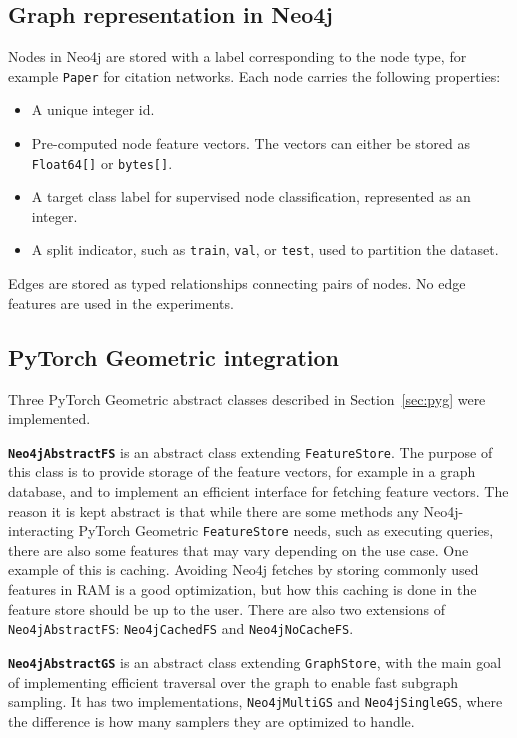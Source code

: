 \documentclass[PhD]{uclathes}
\begin{document}
\subsection{Graph representation in Neo4j}\label{sec:graph_repr}
Nodes in Neo4j are stored with a label corresponding to the node type, for
example \texttt{Paper} for citation networks. Each node carries the following
properties:

\begin{itemize}
    \item A unique integer id.
    \item Pre-computed node feature vectors. The vectors can either be stored as \texttt{Float64[]} or \texttt{bytes[]}.
    \item A target class label for supervised node classification, represented as an integer.
    \item A split indicator, such as \texttt{train}, \texttt{val}, or \texttt{test}, used to partition the dataset.
\end{itemize}

Edges are stored as typed relationships connecting pairs of nodes. No edge
features are used in the experiments.

\subsection{PyTorch Geometric integration}\label{sec:pyg_impl}
Three PyTorch Geometric abstract classes described in Section~\ref{sec:pyg}
were implemented.

\noindent \textbf{\texttt{Neo4jAbstractFS}} is an abstract class extending
\texttt{FeatureStore}. The purpose of this class is to provide storage of the
feature vectors, for example in a graph database, and to implement an
efficient interface for fetching feature vectors. The reason it is kept
abstract is that while there are some methods any Neo4j-interacting PyTorch
Geometric \texttt{FeatureStore} needs, such as executing queries, there are
also some features that may vary depending on the use case. One example of
this is caching. Avoiding Neo4j fetches by storing commonly used features in
RAM is a good optimization, but how this caching is done in the feature store
should be up to the user. There are also two extensions of
\texttt{Neo4jAbstractFS}: \texttt{Neo4jCachedFS} and \texttt{Neo4jNoCacheFS}.

\noindent \textbf{\texttt{Neo4jAbstractGS}} is an abstract class extending
\texttt{GraphStore}, with the main goal of implementing efficient traversal
over the graph to enable fast subgraph sampling. It has two implementations,
\texttt{Neo4jMultiGS} and \texttt{Neo4jSingleGS}, where the difference is how
many samplers they are optimized to handle.
\end{document}
